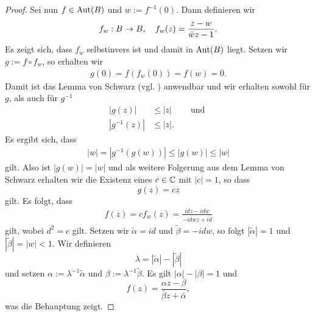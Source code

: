 \begin{proof}
  Sei nun $f \in \operatorname{Aut}(B)$ und $w := f^{-1}(0)$. Dann definieren wir
  \[
  f_w : B \rightarrow B, \quad f_w(z) = \frac{z -w}{\bar w z - 1}.
  \]
  Es zeigt sich, dass $f_w$ selbstinvers ist und damit in $\operatorname{Aut}(B)$
  liegt. Setzen wir $g := f\circ f_w$, so erhalten wir
  \begin{align*}
    g(0) = f( f_w(0)) = f(w) = 0.
  \end{align*}
  Damit ist das Lemma von Schwarz (vgl. \cite[Satz 5.10]{Kas})
  anwendbar und wir erhalten sowohl für $g$, als auch für $g^{-1}$
  \begin{align*}
    |g(z)| & \leq |z| && \text{ und } \\
    |g^{-1}(z)| & \leq |z|.
  \end{align*}
  Es ergibt sich, dass
  \begin{align*}
    |w| = |g^{-1}(g(w))| \leq |g(w)| \leq |w|
  \end{align*}
  gilt. Also ist $|g(w)| = |w|$ und als weitere Folgerung aus dem Lemma
  von Schwarz erhalten wir die Existenz eines $c \in \mathbb{C}$ mit $|c| =
  1$, so dass
  \[
  g(z) = cz
  \]
  gilt. Es folgt, dass
  \begin{align*}
    f(z) = c f_w(z) = \frac{i dz - i dw}{ - \overline{idw} z +
      \overline{i d}}
  \end{align*}
  gilt, wobei $d^2 = c$ gilt. Setzen wir $\tilde \alpha = i d$ und $\tilde
  \beta = - i d w$, so folgt $|\tilde \alpha| = 1$ und $|\tilde \beta|
  = |w| < 1$. Wir definieren
  \[
  \lambda = |\tilde \alpha| - |\tilde \beta|
  \]
  und setzen $\alpha := \lambda^{-1} \tilde \alpha$ und $\beta :=
  \lambda^{-1} \tilde \beta$. Es gilt $|\alpha| - |\beta| = 1$ und
  \[
  f(z) = \frac{\alpha z - \beta}{\bar \beta z  + \bar \alpha},
  \]
  was die Behauptung zeigt.


\end{proof}
